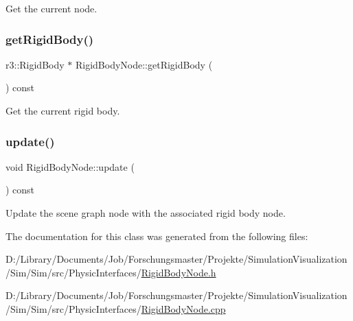 Get the current node. 

\mbox{\label{class_rigid_body_node_ab1a0b587bed1ff3298da3b382ada784f}} 
\subsubsection{\texorpdfstring{get\+Rigid\+Body()}{getRigidBody()}}
{\footnotesize\ttfamily r3\+::\+Rigid\+Body $\ast$ Rigid\+Body\+Node\+::get\+Rigid\+Body (\begin{DoxyParamCaption}{ }\end{DoxyParamCaption}) const}



Get the current rigid body. 

\mbox{\label{class_rigid_body_node_aa40aff305449fa4b1d8b1c665548f862}} 
\subsubsection{\texorpdfstring{update()}{update()}}
{\footnotesize\ttfamily void Rigid\+Body\+Node\+::update (\begin{DoxyParamCaption}{ }\end{DoxyParamCaption}) const}



Update the scene graph node with the associated rigid body node. 



The documentation for this class was generated from the following files\+:\begin{DoxyCompactItemize}
\item 
D\+:/\+Library/\+Documents/\+Job/\+Forschungsmaster/\+Projekte/\+Simulation\+Visualization/\+Sim/\+Sim/src/\+Physic\+Interfaces/\mbox{\hyperlink{_rigid_body_node_8h}{Rigid\+Body\+Node.\+h}}\item 
D\+:/\+Library/\+Documents/\+Job/\+Forschungsmaster/\+Projekte/\+Simulation\+Visualization/\+Sim/\+Sim/src/\+Physic\+Interfaces/\mbox{\hyperlink{_rigid_body_node_8cpp}{Rigid\+Body\+Node.\+cpp}}\end{DoxyCompactItemize}
